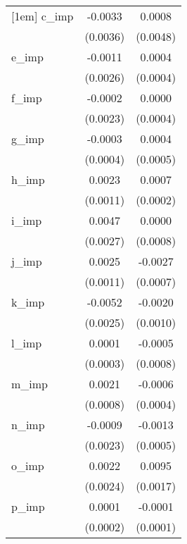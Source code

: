 {\begin{tabular}{l*{2}{c}}
[1em]
c\_imp       &     -0.0033        &      0.0008        \\
            &    (0.0036)        &    (0.0048)        \\
[1em]
e\_imp       &     -0.0011        &      0.0004        \\
            &    (0.0026)        &    (0.0004)        \\
[1em]
f\_imp       &     -0.0002        &      0.0000        \\
            &    (0.0023)        &    (0.0004)        \\
[1em]
g\_imp       &     -0.0003        &      0.0004        \\
            &    (0.0004)        &    (0.0005)        \\
[1em]
h\_imp       &      0.0023\sym{**}&      0.0007\sym{**}\\
            &    (0.0011)        &    (0.0002)        \\
[1em]
i\_imp       &      0.0047\sym{*} &      0.0000        \\
            &    (0.0027)        &    (0.0008)        \\
[1em]
j\_imp       &      0.0025\sym{**}&     -0.0027\sym{**}\\
            &    (0.0011)        &    (0.0007)        \\
[1em]
k\_imp       &     -0.0052\sym{**}&     -0.0020\sym{**}\\
            &    (0.0025)        &    (0.0010)        \\
[1em]
l\_imp       &      0.0001        &     -0.0005        \\
            &    (0.0003)        &    (0.0008)        \\
[1em]
m\_imp       &      0.0021\sym{**}&     -0.0006        \\
            &    (0.0008)        &    (0.0004)        \\
[1em]
n\_imp       &     -0.0009        &     -0.0013\sym{**}\\
            &    (0.0023)        &    (0.0005)        \\
[1em]
o\_imp       &      0.0022        &      0.0095\sym{**}\\
            &    (0.0024)        &    (0.0017)        \\
[1em]
p\_imp       &      0.0001        &     -0.0001        \\
            &    (0.0002)        &    (0.0001)        \\

\end{tabular}}
